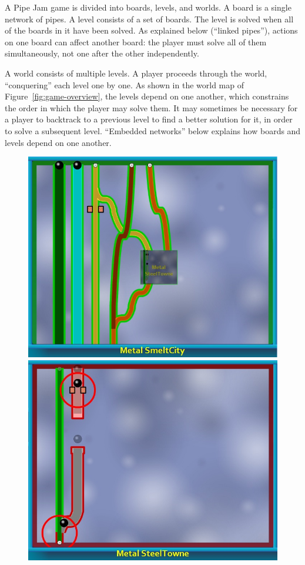 \documentclass[preprint]{sig-alternate}
\newcommand{\figref}[1]{Figure~\ref{#1}}
\let\Description =\description
\def\Nospacing{\itemsep=0pt\topsep=0pt\partopsep=0pt\parskip=0pt\parsep=0pt}
\renewenvironment{description}{\Description\Nospacing}{\endlist}
\begin{document}
\begin{description}

\item[Boards and levels]
  A Pipe Jam game is divided into boards, levels, and worlds.  A board is a
  single network of pipes.  A level consists of a set of boards.  The level
  is solved when all of the boards in it have been solved.  As explained
  below (``linked pipes''), actions on one board can affect another board:
  the player must solve all of them simultaneously, not one after the other
  independently.

\item[Levels and worlds]
  A world consists of multiple levels.  A player proceeds through the
  world, ``conquering'' each level one by one.  As shown in the world map
  of \figref{fig:game-overview}, the levels depend on one another,
  which constrains the order in which the player may solve them.  It may
  sometimes be necessary for a player to backtrack to a previous level to
  find a better solution for it, in order to solve a subsequent level.
  ``Embedded networks'' below explains how boards and levels depend on one
  another.

\begin{figure}
\begin{center}
\includegraphics[width=.49\textwidth]{images/world1-subnetwork}%
\hfill%
\includegraphics[width=.49\textwidth]{images/world1-merge-and-pinch}
\end{center}


\end{figure}
\end{description}
\end{document}

